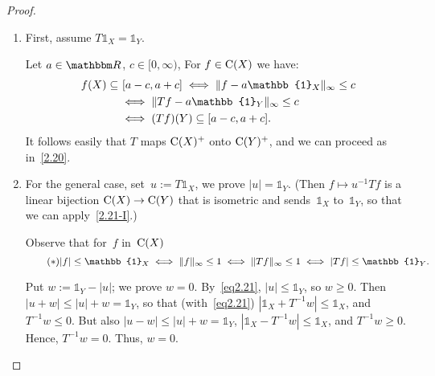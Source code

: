 \documentclass[main.tex]{subfiles}
\begin{document}
\begin{proof}
\begin{enumerate}[label=(\Roman*)]
\item \label{2.21-I}
First,
assume $T\mathbb{1}_X = \mathbb{1}_Y$.

Let $a\in\R$, $c\in[0,\infty)$,
For $f\in \mathrm{C}(X)$ we have:
\begin{align*}
f(X)\subseteq 
  &\  [a-c,a+c] \iff \| f-a\mathbb{1}_X \|_\infty \leq c \\
  & \iff \|Tf - a\mathbb{1}_Y\|_\infty \leq c \\
  & \iff (Tf)(Y) \subseteq [a-c,a+c]
\htam{.}
\end{align*}
It follows easily that $T$ maps $\mathrm{C}(X)^+$ onto $\mathrm{C}(Y)^+$,
and we can proceed as in~\ref{2.20}.
\item \label{2.21-II}
For the general case,
set~$u:=T\mathbb{1}_X$,
we prove $|u|=\mathbb{1}_Y$.
(Then $f\mapsto u^{-1} Tf$
is a linear bijection $\mathrm{C}(X)\rightarrow\mathrm{C}(Y)$ 
that is isometric and sends~$\mathbb{1}_X$ to~$\mathbb{1}_Y$,
so that we can apply~\ref{2.21-I}.)

Observe that for~$f$ in~$\mathrm{C}(X)$
\begin{equation}
\label{eq2.21} \tag{$*$}
|f|\leq \mathbb{1}_X
\iff
\|f\|_\infty \leq 1
\iff
\|Tf \|_\infty \leq 1
\iff
|Tf| \leq \mathbb{1}_Y
\htam{.}
\end{equation}

Put $w:=\mathbb{1}_Y - |u|$;
we prove $w=0$.
By~\eqref{eq2.21},
$|u|\leq\mathbb{1}_Y$, 
so $w\ge 0$.
Then $|u+w|\leq |u|+w=\mathbb{1}_Y$,
so that (with~\eqref{eq2.21})
$|\mathbb{1}_X + T^{-1} w|\leq \mathbb{1}_X$,
and $T^{-1} w\leq 0$.
But also $|u-w|\leq |u|+w=\mathbb{1}_Y$,
$|\mathbb{1}_X - T^{-1} w|\leq \mathbb{1}_X$,
and $T^{-1} w\ge 0$.
Hence, $T^{-1} w=0$.
Thus, $w=0$. \xqed
\end{enumerate}
\end{proof}
\clearpage
\end{document}
